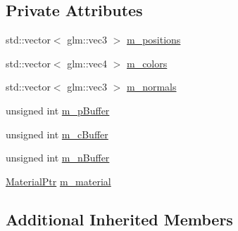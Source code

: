 \subsection*{Private Attributes}
\begin{DoxyCompactItemize}
\item 
std\+::vector$<$ glm\+::vec3 $>$ \hyperlink{classLightedCylinderRenderable_af92700359498f5307fb416f641a9015d}{m\+\_\+positions}
\item 
std\+::vector$<$ glm\+::vec4 $>$ \hyperlink{classLightedCylinderRenderable_a33d59e3d7e08b0123102624da0caa396}{m\+\_\+colors}
\item 
std\+::vector$<$ glm\+::vec3 $>$ \hyperlink{classLightedCylinderRenderable_ae5305cb063f670b7c8943423b82f2d1f}{m\+\_\+normals}
\item 
unsigned int \hyperlink{classLightedCylinderRenderable_abf3d79539f561c684db8394bc489cf38}{m\+\_\+p\+Buffer}
\item 
unsigned int \hyperlink{classLightedCylinderRenderable_a2795079c02ff376e0b4a7e2507371d94}{m\+\_\+c\+Buffer}
\item 
unsigned int \hyperlink{classLightedCylinderRenderable_abb74e2395d504a3393ba2b59276bf361}{m\+\_\+n\+Buffer}
\item 
\hyperlink{Material_8hpp_a1d47cd05ca683e287435cf0b363fbfe1}{Material\+Ptr} \hyperlink{classLightedCylinderRenderable_a69203c5141f12784a61ab3cefb885b3f}{m\+\_\+material}
\end{DoxyCompactItemize}
\subsection*{Additional Inherited Members}


